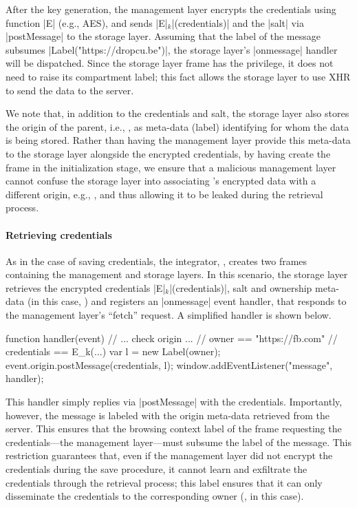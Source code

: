 % 
After the key generation, the management layer encrypts the
credentials using function \js|E| (e.g., AES), and sends
\js|E|$_k$\js|(credentials)| and the \js|salt| via \js|postMessage| to
the storage layer.
%
Assuming that the label of the message subsumes
\js|Label("https://dropcu.be")|, the storage layer's \js|onmessage|
handler will be dispatched. 
%
Since the storage layer frame has the  privilege, it
does not need to raise its compartment label; this fact allows the
storage layer to use XHR to send the data to the 
server.
 
We note that, in addition to the credentials and salt, the storage
layer also stores the origin of the parent, i.e., , as
meta-data (label) identifying for whom the data is being stored.
%
Rather than having the management layer provide this meta-data to the
storage layer alongside the encrypted credentials, by having
 create the frame in the initialization stage, we ensure
that a malicious management layer cannot confuse the storage layer
into associating 's encrypted data with a different
origin, e.g., , and thus allowing it to be leaked during
the retrieval process.

\paragraph{Retrieving credentials}
%
As in the case of saving credentials, the integrator, ,
creates two frames containing the management and storage layers.
%
In this scenario, the storage layer retrieves the encrypted credentials
\js|E|$_k$\js|(credentials)|, salt and ownership meta-data (in this
case, ) and registers an \js|onmessage| event handler,
that responds to the management layer's ``fetch'' request.
A simplified handler is shown below.
\begin{jscode}
function handler(event) {
  // ... check origin ...
  // owner == "https://fb.com"
  // credentials == E_k(...)
  var l = new Label(owner);
  event.origin.postMessage(credentials, l);
} 
window.addEventListener("message", handler);
\end{jscode}
This handler simply replies via \js|postMessage| with the credentials.
%
Importantly, however, the message is labeled with the origin meta-data
retrieved from the server.
%
This ensures that the browsing context label of the frame requesting
the credentials---the management layer---must subsume the label of the
message. 
%
This restriction guarantees that, even if the management layer did not encrypt the
credentials during the save procedure, it cannot learn and
exfiltrate the credentials through the retrieval process; this
label ensures that it can only disseminate the credentials to the
corresponding owner (, in this case).
%

